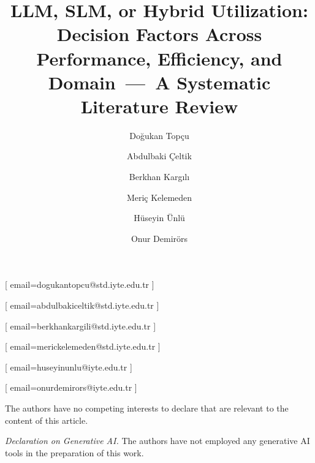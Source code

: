 \documentclass{ceurart}
\begin{document}


\title{LLM, SLM, or Hybrid Utilization: Decision Factors Across
  Performance, Efficiency, and Domain~---~A Systematic Literature
  Review}

\author[1]{Do\u{g}ukan Top\c{c}u}[%
  email=dogukantopcu@std.iyte.edu.tr
]
\author[1]{Abdulbaki \c{C}eltik}[%
  email=abdulbakiceltik@std.iyte.edu.tr
]
\author[1]{Berkhan Karg{\i}l{\i}}[%
  email=berkhankargili@std.iyte.edu.tr
]
\author[1]{Meri\c{c} Kelemeden}[%
  email=merickelemeden@std.iyte.edu.tr
]
\author[1]{H\"{u}seyin \"{U}nl\"{u}}[%
  email=huseyinunlu@iyte.edu.tr
]
\author[1]{Onur Demir\"{o}rs}[%
  email=onurdemirors@iyte.edu.tr
]

\address[1]{Izmir Institute of Technology, Izmir, Turkey}



\maketitle








\begin{acknowledgments}
The authors have no competing interests to declare that are relevant
to the content of this article.

\medskip
\noindent\textit{Declaration on Generative AI.}
The authors have not employed any generative AI tools in the
preparation of this work.
\end{acknowledgments}

\appendix



\end{document}
